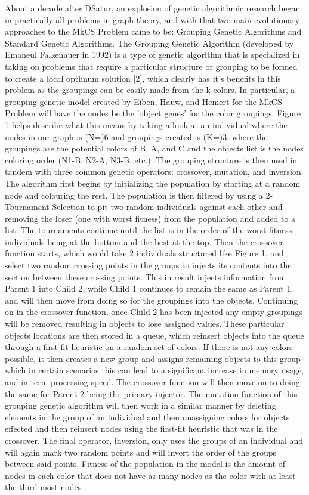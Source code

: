 \documentclass{article}
\begin{document}
  \par About a decade after DSatur, an explosion of genetic algorithmic research began in practically all problems in graph theory, and with that two main evolutionary approaches to the MkCS Problem came to be: Grouping Genetic Algorithms and Standard Genetic Algorithms. The Grouping Genetic Algorithm (developed by Emaneul Falkenauer in 1992) is a type of genetic algorithm that is specialized in taking on problems that require a particular structure or grouping to be formed to create a local optimum solution [2], which clearly has it's benefits in this problem as the groupings can be easily made from the k-colors. In particular, a grouping genetic model created by Eiben, Hauw, and Hemert for the MkCS Problem will have the nodes be the 'object genes' for the color groupings. Figure 1 helps describe what this means by taking a look at an individual where the nodes in our graph is (N=)6 and  groupings created is (K=)3, where the groupings are the potential colors of B, A, and C and the objects list is the nodes coloring order (N1-B, N2-A, N3-B, etc.). The grouping structure is then used in tandem with three common genetic operators: crossover, mutation, and inversion. The algorithm first begins by initializing the population by starting at a random node and colouring the rest. The population is then filtered by using a 2-Tournament Selection to pit two random individuals against each other and removing the loser (one with worst fitness) from the population and added to a list. The tournaments continue until the list is in the order of the worst fitness individuals being at the bottom and the best at the top. Then the crossover function starts, which would take 2 individuals structured like Figure 1, and select two random crossing points in the groups to injects its contents into the section between these crossing points. This in result injects information from Parent 1 into Child 2, while Child 1 continues to remain the same as Parent 1, and will then move from doing so for the groupings into the objects. Continuing on in the crossover function, once Child 2 has been injected any empty groupings will be removed resulting in objects to lose assigned values. These particular objects locations are then stored in a queue, which reinsert objects into the queue through a first-fit heuristic on a random set of colors. If there is not any colors possible, it then creates a new group and assigns remaining objects to this group which in certain scenarios this can lead to a significant increase in memory usage, and in term processing speed. The crossover function will then move on to doing the same for Parent 2 being the primary injector. The mutation function of this grouping genetic algorithm will then work in a similar manner by deleting elements in the group of an individual and then unassigning colors for objects effected and then reinsert nodes using the first-fit heuristic that was in the crossover. The final operator, inversion, only uses the groups of an individual and will again mark two random points and will invert the order of the groups between said points. Fitness of the population in the model is the amount of nodes in each color that does not have as many nodes as the color with at least the third most nodes 
\end{document}

